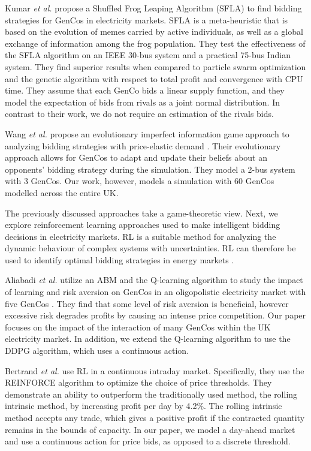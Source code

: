 \documentclass[conference]{IEEEtran}
\begin{document}
Kumar \textit{et al.} propose a Shuffled Frog Leaping Algorithm (SFLA) \cite{VijayaKumar2014} to find bidding strategies for GenCos in electricity markets. SFLA is a meta-heuristic that is based on the evolution of memes carried by active individuals, as well as a global exchange of information among the frog population. They test the effectiveness of the SFLA algorithm on an IEEE 30-bus system and a practical 75-bus Indian system. They find superior results when compared to particle swarm optimization and the genetic algorithm with respect to total profit and convergence with CPU time. They assume that each GenCo bids a linear supply function, and they model the expectation of bids from rivals as a joint normal distribution. In contrast to their work, we do not require an estimation of the rivals bids.

Wang \textit{et al.} propose an evolutionary imperfect information game approach to analyzing bidding strategies with price-elastic demand \cite{Wang2011}. Their evolutionary approach allows for GenCos to adapt and update their beliefs about an opponents' bidding strategy during the simulation. They model a 2-bus system with 3 GenCos. Our work, however, models a simulation with 60 GenCos modelled across the entire UK. 

The previously discussed approaches take a game-theoretic view. Next, we explore reinforcement learning approaches used to make intelligent bidding decisions in electricity markets. RL is a suitable method for analyzing the dynamic behaviour of complex systems with uncertainties. RL can therefore be used to identify optimal bidding strategies in energy markets \cite{Yang2020}.


Aliabadi \textit{et al.} utilize an ABM and the Q-learning algorithm to study the impact of learning and risk aversion on GenCos in an oligopolistic electricity market with five GenCos \cite{EsmaeiliAliabadi2017}. They find that some level of risk aversion is beneficial, however excessive risk degrades profits by causing an intense price competition. Our paper focuses on the impact of the interaction of many GenCos within the UK electricity market. In addition, we extend the Q-learning algorithm to use the DDPG algorithm, which uses a continuous action.

Bertrand \textit{et al.} use RL in a continuous intraday market. Specifically, they use the REINFORCE algorithm to optimize the choice of price thresholds. They demonstrate an ability to outperform the traditionally used method, the rolling intrinsic method, by increasing profit per day by 4.2\%. The rolling intrinsic method accepts any trade, which gives a positive profit if the contracted quantity remains in the bounds of capacity. In our paper, we model a day-ahead market and use a continuous action for price bids, as opposed to a discrete threshold.
\end{document}
